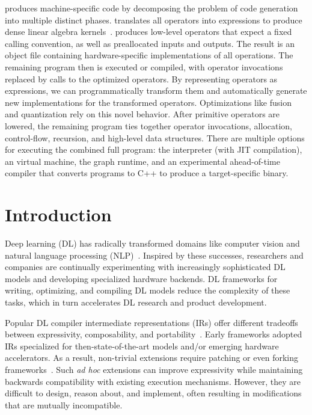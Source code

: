   \relay produces machine-specific code
    by decomposing the problem of code generation into multiple distinct phases.
  \relay translates all operators into \tvm expressions
    to produce dense linear algebra kernels~\citep{tvm_osdi18, tensor_comprehensions, halide}.
  \tvm produces low-level operators that expect a fixed calling convention,
    as well as preallocated inputs and outputs.
  The result is an object file containing hardware-specific implementations of all
    operations.
  The remaining \relay program then is executed or compiled,
    with operator invocations replaced by calls to the optimized operators.
  By representing operators as \tvm expressions, we can programmatically
    transform them and automatically generate new implementations for the transformed operators.
  Optimizations like fusion and quantization
    rely on this novel behavior.
  After primitive operators are lowered,
    the remaining \relay program ties
    together operator invocations, allocation, control-flow,
    recursion, and high-level data structures.
  There are multiple options for executing the combined full program:
    the \relay interpreter (with JIT compilation),
    an \relay virtual machine,
    the \tvm graph runtime,
    and an experimental \relay ahead-of-time compiler
    that converts programs to C++ to produce a target-specific binary.

  \section{Introduction}
  \label{sec:intro}

  Deep learning (DL) has radically transformed domains like
    computer vision and
    natural language processing (NLP)~\citep{yolo, recent_trends_in_nlp}.
  Inspired by these successes,
    researchers and companies are continually
    experimenting with increasingly sophisticated DL models and
    developing specialized hardware backends.
  DL frameworks for writing, optimizing, and compiling DL models
    reduce the complexity of these tasks,
    which in turn accelerates DL research and product development.

  Popular DL compiler intermediate representations (IRs) offer different tradeoffs
    between expressivity, composability, and portability~\citep{
      tensorflow, pytorch_ad, chainer_learningsys2015, tangent, theano, glow}.
  Early frameworks adopted IRs
    specialized for then-state-of-the-art models and/or
    emerging hardware accelerators.
  As a result, non-trivial extensions require
    patching or even forking frameworks~\citep{
      tf_fold, tf_lite, tangent, tf_eager, xla, glow, torchscript}.
  Such \textit{ad hoc} extensions can improve expressivity
    while maintaining backwards compatibility with existing execution mechanisms.
  However, they are difficult to design, reason about, and implement,
    often resulting in modifications that are mutually incompatible.

